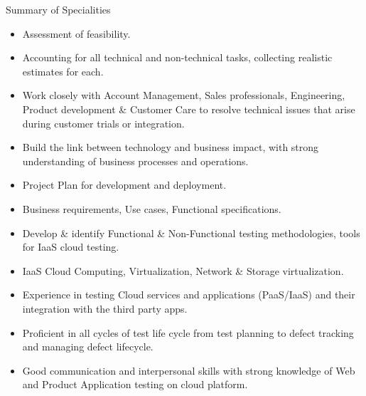 \documentclass[a4paper,12pt]{article}
\begin{document}
\begin{resumesummary}{Summary of Specialities}
\begin{itemize}
  \item Assessment of feasibility.
  \item Accounting for all technical and non-technical tasks, collecting realistic estimates for each.
  \item Work closely with Account Management, Sales professionals, Engineering, Product development \& Customer Care to resolve technical issues that arise during customer trials or integration.
  \item Build the link between technology and business impact, with strong understanding of business processes and operations.
  \item Project Plan for development and deployment.
  \item Business requirements, Use cases, Functional specifications.
  \item Develop \& identify Functional \& Non-Functional testing methodologies, tools for IaaS cloud testing.
  \item IaaS Cloud Computing, Virtualization, Network \& Storage virtualization.
  \item Experience in testing Cloud services and applications (PaaS/IaaS) and their integration with the third party apps.
  \item Proficient in all cycles of test life cycle from test planning to defect tracking and managing defect lifecycle.
  \item Good communication and interpersonal skills with strong knowledge of Web and Product Application testing on cloud platform.
\newline
\end{itemize}
\end{resumesummary}
\end{document}
